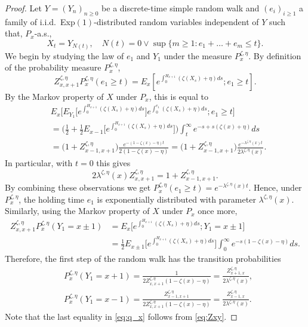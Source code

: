 \documentclass[12pt,reqno,oneside]{amsart}
\numberwithin{equation}{section}
\theoremstyle{definition}
\theoremstyle{remark}
\begin{document}
\begin{proof}
  Let $Y=(Y_n)_{n \geq 0}$ be a discrete-time simple random walk and
  $(e_i)_{i \geq 1}$ a family  of
  i.i.d.~Exp$(1)$-distributed random variables independent of $Y$ such that, $P_x$-a.s.,
  \begin{equation*}
    X_t=Y_{N(t)}, \quad N(t)
    =0 \vee \sup\big\{m \geq 1: e_1 + \dots+e_m \leq t\big\}.
  \end{equation*}
  We begin by studying the law of $e_1$ and $Y_1$ under the measure $P_x^{\zeta, \eta}$.
  By definition of the probability measure $P_x^{\zeta,\eta}$,
  \begin{equation*}
    Z_{x,x+1}^{\zeta,\eta} P_x^{\zeta,\eta}(e_1 \geq t)
    = E_x\left[e^{\int_0^{H_{x+1}} (\zeta(X_s)+\eta ) ds}; e_1 \geq t \right].
  \end{equation*}
  By the Markov property of $X$ under $P_x$, this is equal to
  \begin{align*}
    & E_x\Big[E_{Y_1}\Big[e^{\int_0^{H_{x+1}} (\zeta(X_s)+\eta ) ds} \Big]
      e^{\int_0^{e_1} (\zeta(X_s)+\eta ) ds}; e_1 \geq t \Big]
    \\& =   \bigg(\frac{1}{2}+ \frac{1}{2}
      E_{x-1}\Big[e^{\int_{0}^{H_{x+1}} (\zeta(X_s)+\eta )ds }\Big]\bigg)
    \int_{t}^\infty e^{-s+s(\zeta(x)+\eta)}ds
    \\& =\big(1+Z_{x-1,x+1}^{\zeta, \eta} \big)
    \frac{e^{-(1-\zeta(x)-\eta)t}}{2(1-\zeta(x)-\eta)}
    = \big(1+Z_{x-1,x+1}^{\zeta, \eta} \big)
    \frac{e^{-\lambda^{\zeta,\eta}(x)t}}{2\lambda^{\zeta,\eta}(x)}.
  \end{align*}
  In particular, with $t=0$ this gives
  \begin{equation}\label{eq:formula_lambda}
    2\lambda^{\zeta,\eta}(x)Z_{x,x+1}^{\zeta,\eta}=1+Z_{x-1,x+1}^{\zeta,\eta}.
  \end{equation}
  By combining these observations we get
  $P_x^{\zeta,\eta}(e_1 \geq t)  = e^{-\lambda^{\zeta,\eta}(x)t}$. Hence,
  under $P_x^{\zeta, \eta}$, the holding time $e_1$ is exponentially
  distributed with parameter $\lambda^{\zeta,\eta}(x)$. Similarly, using the
  Markov property of $X $ under $P_x$ once more,
  \begin{align*}
    Z_{x,x+1}^{\zeta,\eta} P_x^{\zeta,\eta}(Y_1 = x\pm1)
    &= E_x\Big[e^{\int_0^{H_{x+1}} (\zeta(X_s)+\eta ) ds}; Y_1 = x\pm1 \Big]\\
    &= \frac{1}{2} E_{x\pm1}\Big[e^{\int_{0}^{H_{x+1}} (\zeta(X_s)+\eta )ds }\Big]
    \int_{0}^\infty e^{-s(1-\zeta(x)-\eta)}ds.
  \end{align*}
  Therefore, the first step of the random walk has the transition probabilities
  \begin{align}
    \label{eq:p_x}
    &P_x^{\zeta,\eta}(Y_1=x+1)=\frac{1}{2Z_{x,x+1}^{\zeta,\eta}(1-\zeta(x)-\eta)}=
    \frac{Z_{x+1,x}^{\zeta,\eta}}{2\lambda^{\zeta,\eta}(x)},\\ \label{eq:q_x}
    &P_x^{\zeta,\eta}(Y_1=x-1)=\frac{Z_{x-1,x+1}^{\zeta,\eta}} {2Z_{x,x+1}^{\zeta,\eta}(1-\zeta(x)-\eta)}
    =\frac{Z_{x-1,x}^{\zeta,\eta}}{2\lambda^{\zeta,\eta}(x)}.
  \end{align}
  Note that the last equality in \eqref{eq:q_x} follows from \eqref{eq:Zxy}.


\end{proof}
\end{document}
